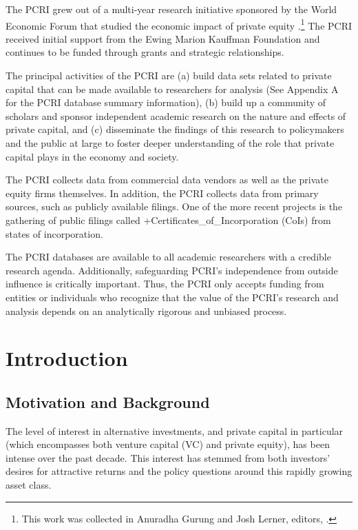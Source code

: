 \documentclass[
]{book}
\begin{document}
The PCRI grew out of a multi-year research initiative sponsored by the World Economic Forum that studied the economic impact of private equity \citep{gurung2008}.\footnote{This work was collected in Anuradha Gurung and Josh Lerner, editors, \citep{gurung2008}.} The PCRI received initial support from the Ewing Marion Kauffman Foundation and continues to be funded through grants and strategic relationships.

The principal activities of the PCRI are (a) build data sets related to private capital that can be made available to researchers for analysis (See Appendix A for the PCRI database summary information), (b) build up a community of scholars and sponsor independent academic research on the nature and effects of private capital, and (c) disseminate the findings of this research to policymakers and the public at large to foster deeper understanding of the role that private capital plays in the economy and society.

The PCRI collects data from commercial data vendors as well as the private equity firms themselves. In addition, the PCRI collects data from primary sources, such as publicly available filings. One of the more recent projects is the gathering of public filings called +Certificates\_of\_Incorporation\textbar{} (CoIs) from states of incorporation.

The PCRI databases are available to all academic researchers with a credible research agenda. Additionally, safeguarding PCRI's independence from outside influence is critically important. Thus, the PCRI only accepts funding from entities or individuals who recognize that the value of the PCRI's research and analysis depends on an analytically rigorous and unbiased process.

\hypertarget{introduction-4}{%
\section{Introduction}\label{introduction-4}}

\hypertarget{motivation-and-background-3}{%
\subsection{Motivation and Background}\label{motivation-and-background-3}}

The level of interest in alternative investments, and private capital in particular (which encompasses both venture capital (VC) and private equity), has been intense over the past decade. This interest has stemmed from both investors' desires for attractive returns and the policy questions around this rapidly growing asset class.
\end{document}
